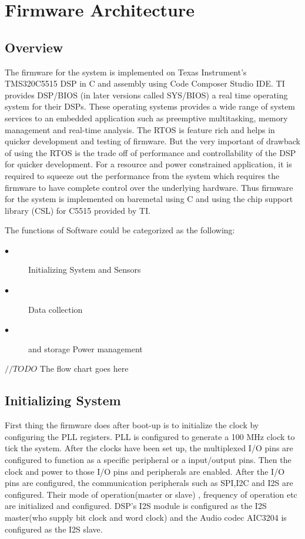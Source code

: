 \chapter{Firmware Architecture}

\section{Overview}
The firmware for the system is implemented on Texas Instrument's TMS320C5515 DSP in C and assembly using Code Composer Studio IDE. TI provides DSP/BIOS (in later versions called SYS/BIOS)  a real time operating system for their DSPs. These operating systems provides a wide range of system services to an embedded application such as preemptive multitasking, memory management and real-time analysis. The RTOS is feature rich and helps in quicker development and testing of firmware. But the very important of drawback of using the RTOS is the trade off of performance and controllability of the DSP for quicker development. For a resource and power constrained application, it is required to squeeze out the performance from the system which requires the firmware to have complete control over the underlying hardware. Thus firmware for the system is implemented on baremetal using  C and using the chip support library (CSL) for C5515 provided by TI. 


\vfill

The functions of Software could be categorized as the following:
 \begin{description}
 	\item[$\bullet$]
Initializing System and Sensors 
 	\item[$\bullet$]
Data collection
 	\item[$\bullet$] and storage 
Power management 
 \end{description}

$//TODO$ The flow chart goes here

\section{Initializing System}
First thing the firmware does after boot-up is to initialize the clock by configuring the PLL registers. PLL is configured to generate a 100 MHz clock to tick the system. After the clocks have been set up, the multiplexed I/O pins are configured to function as a specific peripheral or a input/output pins. Then the clock and power to those I/O pins and peripherals are enabled. After the I/O pins are configured, the communication peripherals such as SPI,I2C and I2S are configured. Their mode of operation(master or slave) , frequency of operation etc are initialized and configured. DSP's I2S module is configured as the I2S master(who supply bit clock and word clock) and the Audio codec AIC3204 is configured as the I2S slave. 

